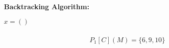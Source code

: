 \begin{minipage}[t]{8cm}
    \centering
    {\Large\bf Backtracking Algorithm:}

    \begin{minipage}{4cm}
        \centering
        \vspace{1.9mm}
        $x=()$
        \begin{graybox}
            \setlength{\abovedisplayskip}{0pt}
            \setlength{\belowdisplayskip}{0pt}
            \vspace{-0.5em}
            \begin{gather*}
                \\P_1[C](M)=\{6,9,10\}\\
            \end{gather*}
        \end{graybox}
        \vspace{-0.75em}
        {\Huge {}}
        \hspace{0.8cm}
        {\Huge{}}
        \hspace{0.8cm}
        {\Huge{}}
    \end{minipage}


\end{minipage}
